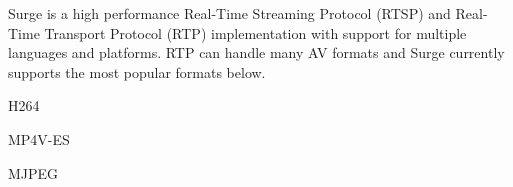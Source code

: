 Surge is a high performance Real-\/\+Time Streaming Protocol (R\+T\+SP) and Real-\/\+Time Transport Protocol (R\+TP) implementation with support for multiple languages and platforms. R\+TP can handle many AV formats and Surge currently supports the most popular formats below.


\begin{DoxyItemize}
\item H264
\item M\+P4\+V-\/\+ES
\item M\+J\+P\+EG 
\end{DoxyItemize}